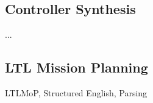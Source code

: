 \subsection{Controller Synthesis}

...

\subsection{LTL Mission Planning}

LTLMoP, Structured English, Parsing